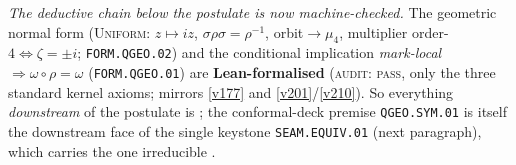 \documentclass[11pt,a4paper]{article}
\begin{document}
\begin{keybox}
\par\smallskip\noindent\emph{The deductive chain below the postulate is now machine-checked.} The
geometric normal form (\textsc{Uniform}: $z\mapsto iz$, $\sigma\rho\sigma=\rho^{-1}$, orbit$\to\mu_4$,
multiplier order-$4\Leftrightarrow\zeta{=}\pm i$; \texttt{FORM.QGEO.02}) and the conditional implication
\emph{mark-local}$\Rightarrow\omega\circ\rho=\omega$ (\texttt{FORM.QGEO.01}) are \textbf{Lean-formalised}
(\textsc{audit: pass}, only the three standard kernel axioms; mirrors \vref{v177} and \vref{v201}/\vref{v210}).
So everything \emph{downstream} of the postulate is \mE; the conformal-deck premise \texttt{QGEO.SYM.01} is
itself the downstream face of the single keystone \texttt{SEAM.EQUIV.01} (next paragraph), which carries the
one irreducible \mO.
\end{keybox}
\end{document}
